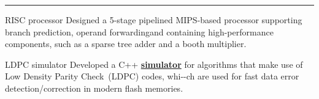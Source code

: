 \vspace{-3mm}
\rule{\textwidth}{0.5pt}\vspace{-1mm}

\vspace{-1mm}
\begin{cvskills}

\cvskill
{RISC processor}
{Designed a 5-stage pipelined MIPS-based processor supporting 
branch prediction, operand forwarding\linebreak and containing high-performance 
components, such as a sparse tree adder and a booth multiplier.}

\cvskill
{LDPC simulator}
{Developed a C++ 
{\color{myblue}\href{https://github.com/djah/LDPC_simulator}{\textbf{simulator}}}
for algorithms that make use of Low Density Parity Check~(LDPC) codes, 
whi-\linebreak -ch are used for fast data error detection/correction in modern 
flash memories.}

\end{cvskills}
